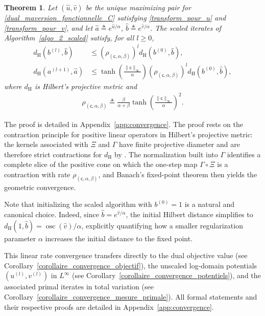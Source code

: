 \documentclass{article}
\newtheorem{theorem}{Theorem}[section]
\begin{document}
\begin{theorem}
  \label{theoreme_linear_rate_scaled_hilbert}
  Let $(\hat{u}, \hat{v})$ be the unique maximizing pair for
  \eqref{dual_maversion_fonctionnelle_C} satisfying \eqref{transform_pour_u} and
  \eqref{transform_pour_v}, and let $\hat{a} \triangleq e^{\hat{u}/\alpha}$,
  $\hat{b} \triangleq e^{\hat{v}/\alpha}$. The scaled iterates of
  Algorithm~\ref{algo_2_scaled} satisfy, for all $l \geq 0$,
  \begin{align}
    \label{linear_speed_1}
    d_{\mathrm{H}}\!\left(b^{(l)}, \hat{b}\right)
    &\leq
    \left(\rho_{(\mathsf{c},\alpha,\beta)}\right)^{l}
    d_{\mathrm{H}}\!\left(b^{(0)}, \hat{b}\right),
    \\
    \label{linear_speed_2}
    d_{\mathrm{H}}\!\left(a^{(l+1)}, \hat{a}\right)
    &\leq
    \tanh\!\left(\frac{\|\mathsf{c}\|_\infty}{\alpha}\right)
    \left(\rho_{(\mathsf{c},\alpha,\beta)}\right)^{l}
    d_{\mathrm{H}}\!\left(b^{(0)}, \hat{b}\right),
  \end{align}
  where $d_{\mathrm H}$ is Hilbert's projective metric \cite[Equation~(2.2)]{Lemmens2013BirkhoffsVO} and
  \begin{align}
    \label{formule_rho}
    \rho_{(\mathsf{c},\alpha,\beta)}
    \triangleq
    \frac{\beta}{\alpha+\beta}
    \tanh\!\left(\frac{\|\mathsf{c}\|_\infty}{\alpha}\right)^{\!2}.
  \end{align}
\end{theorem}
The proof is detailed in Appendix~\ref{app:convergence}. The proof rests on the contraction principle for positive linear operators in Hilbert's projective metric: the kernels associated with $\Xi$ and $\Gamma$ have finite projective diameter and are therefore strict contractions for $d_{\mathrm H}$ by \cite[Theorem~2.9]{Lemmens2013BirkhoffsVO}. The normalization built into $\Gamma$ identifies a complete slice of the positive cone on which the one-step map $\Gamma\circ\Xi$ is a contraction with rate $\rho_{(\mathsf{c},\alpha,\beta)}$, and Banach's fixed-point theorem then yields the geometric convergence.


Note that initializing the scaled algorithm with $b^{(0)} = 1$ is a natural and canonical choice. Indeed, since $\hat{b} = e^{\hat{v}/\alpha}$, the initial Hilbert distance simplifies to $d_{\mathrm{H}}(1, \hat{b}) = \operatorname{osc}(\hat{v})/\alpha$, explicitly quantifying how a smaller regularization parameter $\alpha$ increases the initial distance to the fixed point.


This linear rate convergence transfers directly to the dual objective value (see Corollary~\ref{corollaire_convergence_objectif}), the unscaled log-domain potentials $(u^{(l)}, v^{(l)})$ in $L^\infty$ (see Corollary~\ref{corollaire_convergence_potentiels}), and the associated primal iterates in total variation (see Corollary~\ref{corollaire_convergence_mesure_primale}). All formal statements and their respective proofs are detailed in Appendix~\ref{app:convergence}.
\end{document}
